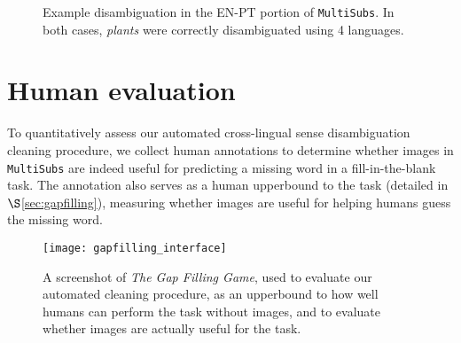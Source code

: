 \documentclass[twocolumn]{svjour3}          \smartqed  \usepackage{graphicx}
\newcommand{\multisubs}{\texttt{MultiSubs}\xspace}
\begin{document}
\begin{figure}[t]
    \centering
    \caption{Example disambiguation in the EN-PT portion of \multisubs. In both cases, \textit{plants} were correctly disambiguated using 4 languages.}
    \label{fig:egdisambiguation}
\end{figure}

\section{Human evaluation}
\label{sec:gapfilling-human}

To quantitatively assess our automated cross-lingual sense disambiguation cleaning procedure, we collect human annotations to determine whether images in \multisubs are indeed useful for predicting a missing word in a fill-in-the-blank task. The annotation also serves as a human upperbound to the task (detailed in $\S$\ref{sec:gapfilling}), measuring whether images are useful for helping humans guess the missing word.

\begin{figure}
    \centering
    \texttt{[image: gapfilling\_interface]}
    \caption{A screenshot of \textit{The Gap Filling Game}, used to evaluate our automated cleaning procedure, as an upperbound to how well humans can perform the task without images, and to evaluate whether images are actually useful for the task.}
    \label{fig:interface}
\end{figure}
\end{document}
